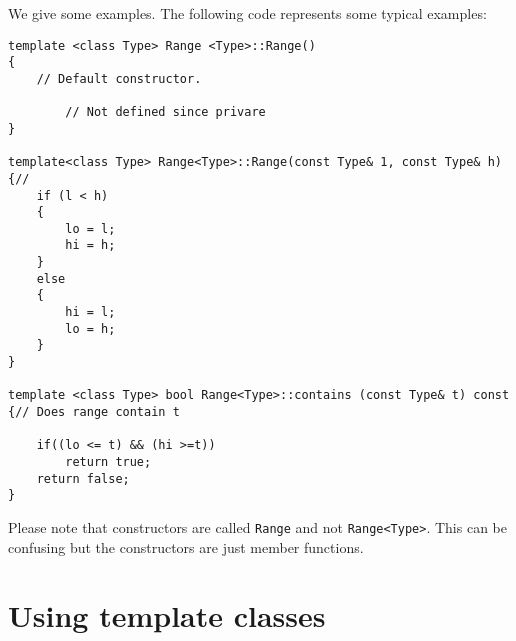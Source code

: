 We give some examples. The following code represents some typical examples:
\begin{lstlisting}
template <class Type> Range <Type>::Range()
{
	// Default constructor.

		// Not defined since privare
}

template<class Type> Range<Type>::Range(const Type& 1, const Type& h)
{//
	if (l < h)
	{
		lo = l;
		hi = h;
	}
	else
	{
		hi = l;
		lo = h;
	}
}

template <class Type> bool Range<Type>::contains (const Type& t) const
{// Does range contain t

	if((lo <= t) && (hi >=t))
		return true;
	return false;
}
\end{lstlisting}
Please note that constructors are called \texttt{Range} and not \texttt{Range<Type>}. This can be confusing but the constructors are just member functions.

\section{Using template classes}

